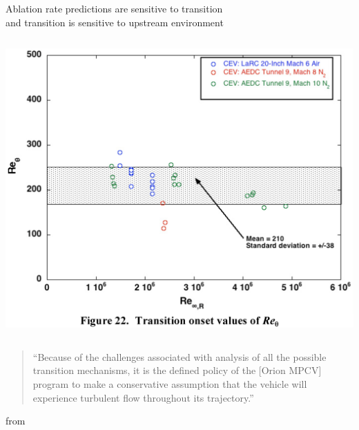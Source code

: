 \documentclass[mathserif]{beamer}
\begin{document}
\begin{frame}{Ablation rate predictions are sensitive to transition\\
              and transition is sensitive to upstream environment}
\vspace{0.25em}
\begin{columns}[t]
  \begin{column}{.50\linewidth}
    \includegraphics[width=0.99\linewidth]{Hollis2008_Figure22.png}\\
  \end{column}
\end{columns}
\small
\begin{quote}
  ``Because of the challenges associated with analysis of all the possible
  transition mechanisms, it is the defined policy of the [Orion MPCV]
  program to make a conservative assumption that the vehicle will
  experience turbulent flow throughout its trajectory.''
\end{quote}
\vspace{-2.5em}
\begin{flushright}
  from \citet{Hollis2008Aeroheating}
\end{flushright}
\end{frame}
\end{document}
